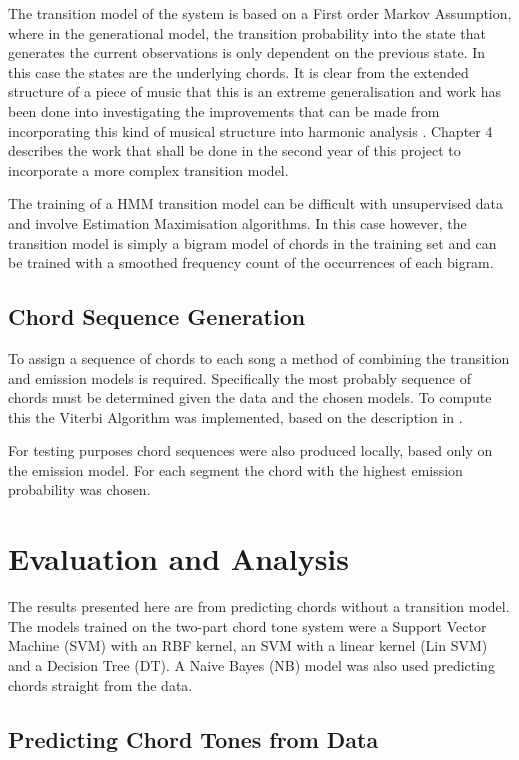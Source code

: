 \documentclass[bsc,singlespacing,parskip,deptreport,twoside,frontabs]{infthesis}
\begin{document}
The transition model of the system is based on a First order Markov Assumption, where in the generational model, the transition probability into the state that generates the current observations is only dependent on the previous state. In this case the states are the underlying chords. It is clear from the extended structure of a piece of music that this is an extreme generalisation and work has been done into investigating the improvements that can be made from incorporating this kind of musical structure into harmonic analysis \cite{struct}. Chapter 4 describes the work that shall be done in the second year of this project to incorporate a more complex transition model.

The training of a HMM transition model can be difficult with unsupervised data and involve Estimation Maximisation algorithms. In this case however, the transition model is simply a bigram model of chords in the training set and can be trained with a smoothed frequency count of the occurrences of each bigram.

\section{Chord Sequence Generation}

To assign a sequence of chords to each song a method of combining the transition and emission models is required. Specifically the most probably sequence of chords must be determined given the data and the chosen models. To compute this the Viterbi Algorithm was implemented, based on the description in \cite{jur}.

For testing purposes chord sequences were also produced locally, based only on the emission model. For each segment the chord with the highest emission probability was chosen.

\chapter{Evaluation and Analysis}

The results presented here are from predicting chords without a transition model. The models trained on the two-part chord tone system were a Support Vector Machine (SVM) with an RBF kernel, an SVM with a linear kernel (Lin SVM) and a Decision Tree (DT). A Naive Bayes (NB) model was also used predicting chords straight from the data.

\section{Predicting Chord Tones from Data}
\end{document}
